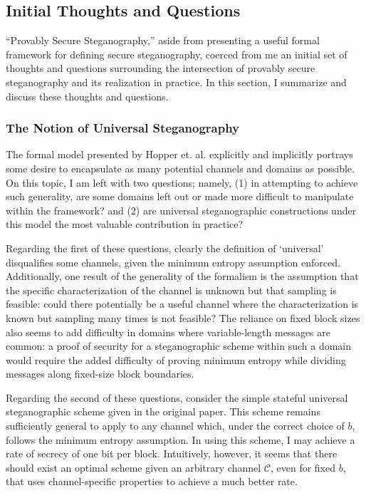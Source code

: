 \documentclass{article}
\begin{document}
\subsection{Initial Thoughts and Questions}

``Provably Secure Steganography,'' aside from presenting a useful formal framework 
for defining secure steganography, coerced from me an initial set of thoughts and 
questions surrounding the intersection of provably secure steganography and 
its realization in practice.  In this section, I summarize and discuss these thoughts
 and questions.

\subsubsection{The Notion of Universal Steganography}

The formal model presented by Hopper et. al. explicitly 
and implicitly portrays some desire to encapsulate as many potential channels and domains 
as possible.  On this topic, I am left with two questions; namely, (1) in attempting to achieve such generality, 
are some domains left out or made more difficult to manipulate within the framework?  and (2) are universal steganographic constructions under this model the most valuable contribution in practice?

Regarding the first of these questions, clearly the definition of `universal' disqualifies some channels, given 
the minimum entropy assumption enforced.   Additionally, one 
result of the generality of the formalism is the assumption that the specific characterization of the 
channel is unknown but that sampling is feasible: could there potentially be a useful channel 
where the characterization is known but sampling many times is not feasible?  The reliance on fixed block sizes 
also seems to add difficulty in domains where variable-length messages are common: a proof of security for a steganographic 
scheme within such a domain would require the added difficulty of proving minimum entropy while dividing 
messages along fixed-size block boundaries.

Regarding the second of these questions, consider the simple stateful universal steganographic 
scheme given in the original paper.  This scheme remains sufficiently general to apply to 
any channel which, under the correct choice of $b$, follows the minimum entropy assumption.  In using this scheme,
I may achieve a rate of secrecy of one bit per block.  Intuitively, however, it seems that there should exist an optimal scheme given an arbitrary channel $\mathcal{C}$, even for fixed $b$, that uses channel-specific properties to achieve a much better rate.  
\end{document}
